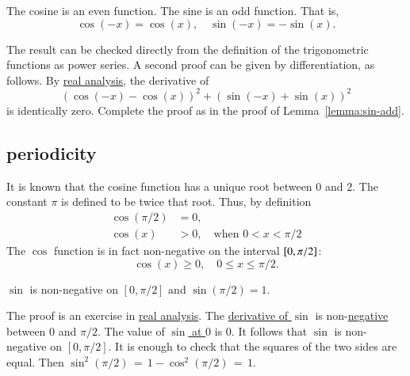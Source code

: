 \begin{lemma}[]\label{lemma:cos-neg}
  The cosine is an even function.  The sine is an odd function.  That
  is,
\begin{displaymath}
\cos(-x) = \cos(x),\quad\sin(-x) =
    -\sin(x).
\end{displaymath}
\end{lemma}
%
%
%


\begin{proved}
The result can be checked directly from the definition of the trigonometric functions
as power series.  A second proof can be given by differentiation, as follows.
By \hyperref[back:analysis]{real analysis}, the derivative of
\begin{displaymath}
(\cos(-x) - \cos(x))^2 + (\sin(-x)
  +\sin(x))^2
\end{displaymath}
is identically zero.  Complete the proof as in the proof of
Lemma~\ref{lemma:sin-add}.  \swallowed\end{proved}

\subsection{periodicity}
\label{sec:pi}
%

It is known that the cosine function has a unique root between $0$
and $2$. The constant $\pi$ is defined to be twice that root.  Thus, by
definition 
\begin{align}\label{eqn:cospi2}
\cos(\pi/2) &= 0,\nonumber\\
\cos(x) &>0,\quad \text{when } 0<x<\pi/2
\end{align}
The $\cos$ function is in fact
non-negative on the interval $[ 0,\pi/2]$:
\begin{equation}\label{eqn:cospos}
\cos(x)\ge 0,   \quad 0\le x \le \pi/2.
\end{equation}
%

\begin{lemma}[]\label{lemma:sin-pi2}
$\sin$ is non-negative on $[0,\pi/2]$ and  $\sin (\pi/2) = 1.$
\end{lemma}

\begin{proved}
  The proof is an exercise in \hyperref[back:analysis]{real analysis}.
  The \hyperref[eqn:cos']{derivative of $\sin$} is
  non-\hyperref[eqn:cospos]{negative} between $0$ and $\pi/2$.  The
  value of \hyperref[eqn:cos0]{$\sin$ at $0$} is $0$.  It follows that
  $\sin$ is non-negative on $[0,\pi/2]$.  It is enough to check that
  the squares of the two sides are equal.  Then $\sin^2(\pi/2)
  \hyperref[lemma:circle]{\,=\,} {1-\cos^2(\pi/2)}
  \hyperref[eqn:cospi2]{\,=\,} 1$.  \swallowed\end{proved}

